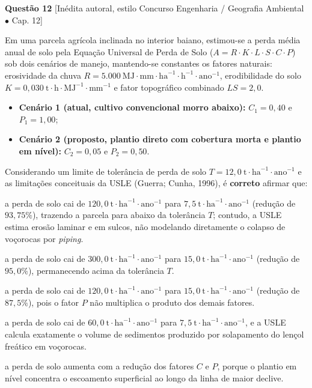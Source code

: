 \vspace{6pt}
\noindent\textbf{Questão 12} {\footnotesize\color{uefsMuted}[Inédita autoral, estilo Concurso Engenharia / Geografia Ambiental $\bullet$ Cap. 12]}\par
Em uma parcela agrícola inclinada no interior baiano, estimou-se a perda média anual de solo pela Equação Universal de Perda de Solo ($A = R \cdot K \cdot L \cdot S \cdot C \cdot P$) sob dois cenários de manejo, mantendo-se constantes os fatores naturais: erosividade da chuva $R = 5.000\ \text{MJ}\cdot\text{mm}\cdot\text{ha}^{-1}\cdot\text{h}^{-1}\cdot\text{ano}^{-1}$, erodibilidade do solo $K = 0,030\ \text{t}\cdot\text{h}\cdot\text{MJ}^{-1}\cdot\text{mm}^{-1}$ e fator topográfico combinado $LS = 2,0$.
\begin{itemize}[leftmargin=1.8em, itemsep=1.5pt, topsep=3pt]
  \item \textbf{Cenário 1 (atual, cultivo convencional morro abaixo):} $C_1 = 0,40$ e $P_1 = 1,00$;
  \item \textbf{Cenário 2 (proposto, plantio direto com cobertura morta e plantio em nível):} $C_2 = 0,05$ e $P_2 = 0,50$.
\end{itemize}
Considerando um limite de tolerância de perda de solo $T = 12,0\ \text{t}\cdot\text{ha}^{-1}\cdot\text{ano}^{-1}$ e as limitações conceituais da USLE (Guerra; Cunha, 1996), é \textbf{correto} afirmar que:
\begin{alternativas}
  \item a perda de solo cai de $120,0\ \text{t}\cdot\text{ha}^{-1}\cdot\text{ano}^{-1}$ para $7,5\ \text{t}\cdot\text{ha}^{-1}\cdot\text{ano}^{-1}$ (redução de $93,75\%$), trazendo a parcela para abaixo da tolerância $T$; contudo, a USLE estima erosão laminar e em sulcos, não modelando diretamente o colapso de voçorocas por \textit{piping}.
  \item a perda de solo cai de $300,0\ \text{t}\cdot\text{ha}^{-1}\cdot\text{ano}^{-1}$ para $15,0\ \text{t}\cdot\text{ha}^{-1}\cdot\text{ano}^{-1}$ (redução de $95,0\%$), permanecendo acima da tolerância $T$.
  \item a perda de solo cai de $120,0\ \text{t}\cdot\text{ha}^{-1}\cdot\text{ano}^{-1}$ para $15,0\ \text{t}\cdot\text{ha}^{-1}\cdot\text{ano}^{-1}$ (redução de $87,5\%$), pois o fator $P$ não multiplica o produto dos demais fatores.
  \item a perda de solo cai de $60,0\ \text{t}\cdot\text{ha}^{-1}\cdot\text{ano}^{-1}$ para $7,5\ \text{t}\cdot\text{ha}^{-1}\cdot\text{ano}^{-1}$, e a USLE calcula exatamente o volume de sedimentos produzido por solapamento do lençol freático em voçorocas.
  \item a perda de solo aumenta com a redução dos fatores $C$ e $P$, porque o plantio em nível concentra o escoamento superficial ao longo da linha de maior declive.
\end{alternativas}

